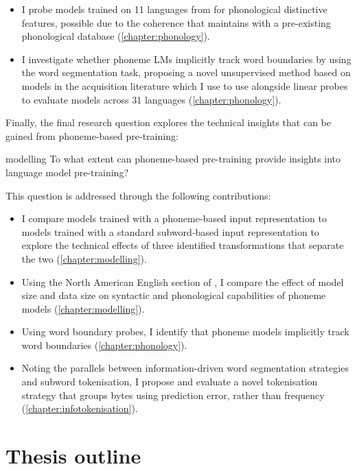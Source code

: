 \begin{itemize}
    \item I probe models trained on 11 languages from \ipachildes for phonological distinctive features, possible due to the coherence that \gpp maintains with a pre-existing phonological database (\cref{chapter:phonology}).
    \item I investigate whether phoneme LMs implicitly track word boundaries by using the word segmentation task, proposing a novel unsupervised method based on models in the acquisition literature which I use to use alongside linear probes to evaluate models across 31 languages (\cref{chapter:phonology}).
\end{itemize}

Finally, the final research question explores the technical insights that can be gained from phoneme-based pre-training:

\begin{question}{}{modelling}
    To what extent can phoneme-based pre-training provide insights into language model pre-training?
\end{question}

This question is addressed through the following contributions:

\begin{itemize}
    \item I compare models trained with a phoneme-based input representation to models trained with a standard subword-based input representation to explore the technical effects of three identified transformations that separate the two (\cref{chapter:modelling}).
    \item Using the North American English section of \ipachildes, I compare the effect of model size and data size on syntactic and phonological capabilities of phoneme models (\cref{chapter:modelling}).
    \item Using word boundary probes, I identify that phoneme models implicitly track word boundaries (\cref{chapter:phonology}).
    \item Noting the parallels between information-driven word segmentation strategies and subword tokenisation, I propose and evaluate a novel tokenisation strategy that groups bytes using prediction error, rather than frequency (\cref{chapter:infotokenisation}).
\end{itemize}

\section{Thesis outline}

